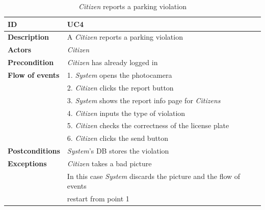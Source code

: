 \documentclass{article}
\begin{document}
\begin{table}
    \begin{center}
    \centering
\begin{tabular}{ | l | l |}
\hline
\textbf{ID} & UC4 \\
\hline
\textbf{Description} & A \textit{Citizen} reports a parking violation  \\
\hline
\textbf{Actors} & \textit{Citizen} \\
\hline
\textbf{Precondition} & \textit{Citizen} has already logged in \\
\hline
\textbf{Flow of events} & 1. \textit{System} opens the photocamera \\
                        & 2. \textit{Citizen} clicks the report button \\
                        & 3. \textit{System} shows the report info page for \textit{Citizens} \\
                        & 4. \textit{Citizen} inputs the type of violation \\
                        & 5. \textit{Citizen} checks the correctness of the license plate \\
                        & 6. \textit{Citizen} clicks the send button \\
\hline
\textbf{Postconditions} & \textit{System}'s DB stores the violation  \\
\hline
\textbf{Exceptions} & \textit{Citizen} takes a bad picture \\
                    & In this case \textit{System} discards the picture and the flow of events  \\
                    & restart from point 1\\  
\hline
\end{tabular}
\caption{\textit{Citizen} reports a parking violation}
\end{center}
\end{table}
\end{document}
